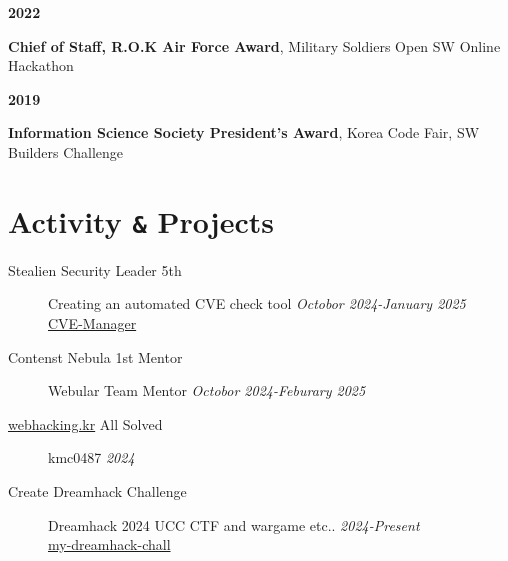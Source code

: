 \documentclass[margin,line]{resume}
\begin{document}
\begin{resume}
        \textbf{2022}
        \vspace{1mm}
        \begin{list2}
          \item \textbf{Chief of Staff, R.O.K Air Force Award}, Military Soldiers Open SW Online Hackathon
        \end{list2}
        
        \textbf{2019}
        \vspace{1mm}
        \begin{list2}
          \item \textbf{Information Science Society President's Award}, Korea Code Fair, SW Builders Challenge \\
        \end{list2}

    

 	    \section{\mysidestyle Activity \texttt{\&} Projects}\vspace{2mm}   	   
 	   
 	          
            \begin{description}   
                \item[Stealien Security Leader 5th]\small{Creating an automated CVE check tool \hfill \textsl{Octobor 2024-January 2025}}\\
 				    \faGithub\space\href{https://github.com/minchan02/CVE-Manager}{CVE-Manager}
 			\vspace{2mm}
  	      		        
   		    \item[Contenst Nebula 1st Mentor]\small{Webular Team Mentor \hfill \textsl{Octobor 2024-Feburary 2025}}\\ 	
 	      	\vspace{2mm}
   
    		\item[\href{https://webhacking.kr}{webhacking.kr} All Solved]\small{kmc0487 \hfill \textsl{2024}}\\
  	      		
 			\vspace{2mm}

                \item[Create Dreamhack Challenge]\small{Dreamhack 2024 UCC CTF and wargame etc.. \hfill \textsl{2024-Present}}\\
  	      		\faLink\space\href{https://dreamhack.io/wargame?search=Predic}{my-dreamhack-chall}
 			\vspace{2mm}


\end{description}
\end{resume}
\end{document}
